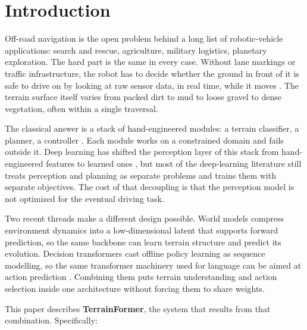 \documentclass[sensors,article,submit,pdftex,moreauthors]{Definitions/mdpi}
\begin{document}
\section{Introduction}
\label{sec:introduction}
Off-road navigation is the open problem behind a long list of robotic-vehicle applications: search and rescue, agriculture, military logistics, planetary exploration. The hard part is the same in every case. Without lane markings or traffic infrastructure, the robot has to decide whether the ground in front of it is safe to drive on by looking at raw sensor data, in real time, while it moves \cite{wellhausen2019, xiao2021}. The terrain surface itself varies from packed dirt to mud to loose gravel to dense vegetation, often within a single traversal.

The classical answer is a stack of hand-engineered modules: a terrain classifier, a planner, a controller \cite{papadakis2013}. Each module works on a constrained domain and fails outside it. Deep learning has shifted the perception layer of this stack from hand-engineered features to learned ones \cite{maturana2018, wigness2019}, but most of the deep-learning literature still treats perception and planning as separate problems and trains them with separate objectives. The cost of that decoupling is that the perception model is not optimized for the eventual driving task.

Two recent threads make a different design possible. World models \cite{ha2018, hafner2020, hafner2023} compress environment dynamics into a low-dimensional latent that supports forward prediction, so the same backbone can learn terrain structure and predict its evolution. Decision transformers \cite{chen2021, zheng2022} cast offline policy learning as sequence modelling, so the same transformer machinery used for language can be aimed at action prediction \cite{vaswani2017}. Combining them puts terrain understanding and action selection inside one architecture without forcing them to share weights.

This paper describes \textbf{TerrainFormer}, the system that results from that combination. Specifically:
\end{document}
